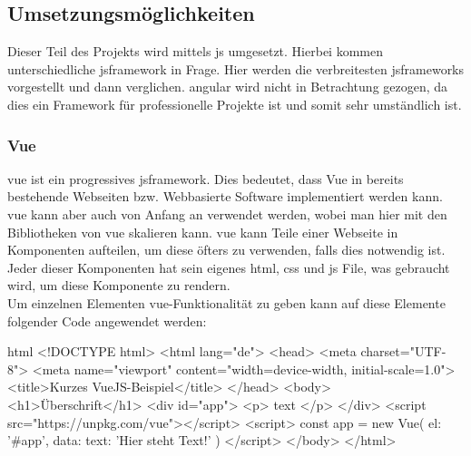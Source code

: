 \subsection{Umsetzungsmöglichkeiten}
Dieser Teil des Projekts wird mittels \Gls{js} umgesetzt. Hierbei kommen unterschiedliche \Gls{jsframework} in Frage. Hier werden die verbreitesten \Gls{jsframework}s vorgestellt und dann verglichen. \Gls{angular} wird nicht in Betrachtung gezogen, da dies ein Framework  für professionelle Projekte ist und somit sehr umständlich ist\cite{angular_ex}.
\subsubsection{Vue}
\gls{vue} ist ein progressives \Gls{jsframework}. Dies bedeutet, dass Vue in bereits bestehende Webseiten bzw. Webbasierte Software implementiert werden kann.\\
\Gls{vue} kann aber auch von Anfang an verwendet werden, wobei man hier mit den Bibliotheken von \Gls{vue} skalieren kann\cite{vuedoc}. \Gls{vue} kann Teile einer Webseite in Komponenten aufteilen, um diese öfters zu verwenden, falls dies notwendig ist. Jeder dieser Komponenten hat sein eigenes \Gls{html}, \Gls{css} und \Gls{js} File, was gebraucht wird, um diese Komponente zu rendern.\\
Um einzelnen Elementen \Gls{vue}-Funktionalität zu geben kann auf diese Elemente folgender Code angewendet werden\cite{vuedoc}:
\begin{code}{html}
	<!DOCTYPE html>
	<html lang="de">
		<head>
			<meta charset="UTF-8">
			<meta name="viewport" content="width=device-width, initial-scale=1.0">
			<title>Kurzes VueJS-Beispiel</title>
		</head>
		<body>
			<h1>Überschrift</h1>
			<div id="app">
				<p> {{ text }} </p>
			</div>
			<script src="https://unpkg.com/vue"></script>
			<script>
				const app = new Vue({
					el: '#app',
					data: {
						text: 'Hier steht Text!'
					}
				})
			</script>
		</body>
	</html>
\end{code}
